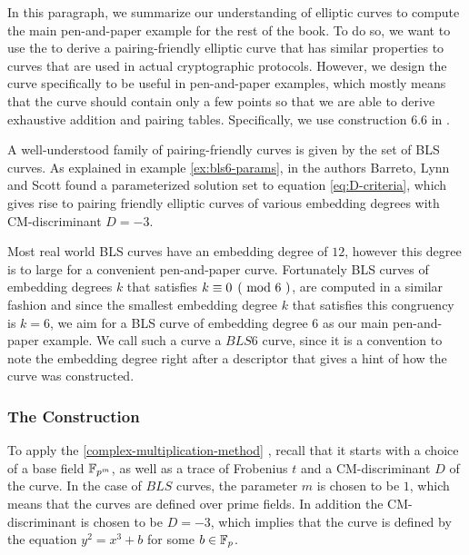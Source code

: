 In this paragraph, we summarize our understanding of elliptic curves to compute the main pen-and-paper example for the rest of the book. To do so, we want to use the  to derive a pairing-friendly elliptic curve that has similar properties to curves that are used in actual cryptographic protocols. However, we design the curve specifically to be useful in pen-and-paper examples, which mostly means that the curve should contain only a few points so that we are able to derive exhaustive addition and pairing tables. Specifically, we use construction 6.6 in \cite{freeman-2020}.

A well-understood family of pairing-friendly curves is given by the set of BLS curves. As explained in example \ref{ex:bls6-params}, in \cite{bls-02} the authors Barreto, Lynn and Scott found a parameterized solution set to equation \ref{eq:D-criteria}, which gives rise to pairing friendly elliptic curves of various embedding degrees with CM-discriminant $D = -3$. 

Most real world BLS curves have an embedding degree of $12$, however this degree is to large for a convenient pen-and-paper curve. Fortunately BLS curves of embedding degrees $k$ that satisfies $\kongru{k}{0}{6}$, are computed in a similar fashion and since the smallest embedding degree $k$ that satisfies this congruency is $k=6$, we aim for a BLS curve of embedding degree 6 as our main pen-and-paper example. We call such a curve a $BLS6$ curve, since it is a convention to note the embedding degree right after a descriptor that gives a hint of how the curve was constructed.  

\subsubsection{The Construction}
To apply the  \ref{complex-multiplication-method} , recall that it starts with a choice of a base field $\mathbb{F}_{p^m}$, as well as a trace of Frobenius $t$ and a CM-discriminant $D$ of the curve. In the case of $BLS$ curves, the parameter $m$ is chosen to be $1$, which means that the curves are defined over prime fields. In addition the CM-discriminant is chosen to be $D=-3$, which implies that the curve is defined by the equation $y^2 = x^3 +b$ for some $b\in \mathbb{F}_p$. 

